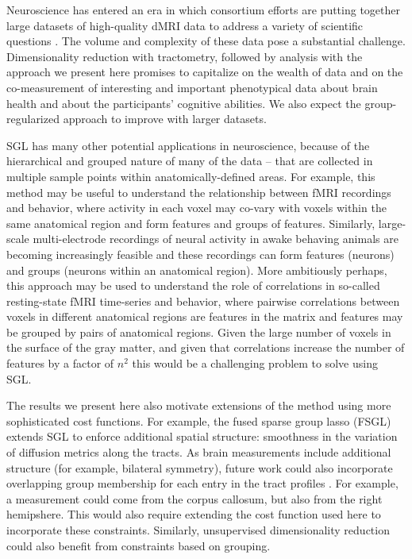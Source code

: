 Neuroscience has entered an era in which consortium efforts are putting together
large datasets of high-quality dMRI data to address a variety of scientific
questions \cite{jernigan2016ping, jernigan2018abcd, alexander2017open,
Miller2016-hw, VanEssen2012}. The volume and complexity of these data pose a
substantial challenge. Dimensionality reduction with tractometry, followed by
analysis with the approach we present here promises to capitalize on the wealth
of data and on the co-measurement of interesting and important phenotypical data
about brain health and about the participants' cognitive abilities. We also
expect the group-regularized approach to improve with larger datasets.

SGL has many other potential applications in neuroscience, because of the
hierarchical and grouped nature of many of the data -- that are collected in
multiple sample points within anatomically-defined areas. For example, this
method may be useful to understand the relationship between fMRI recordings and
behavior, where activity in each voxel may co-vary with voxels within the same
anatomical region and form features and groups of features. Similarly,
large-scale multi-electrode recordings of neural activity in awake behaving
animals are becoming increasingly feasible \cite{steinmetz2018distributed,
Jun2017-gv} and these recordings can form features (neurons) and groups (neurons
within an anatomical region). More ambitiously perhaps, this approach may be
used to understand the role of correlations in so-called resting-state fMRI
time-series and behavior, where pairwise correlations between voxels in
different anatomical regions are features in the matrix and features may be
grouped by pairs of anatomical regions. Given the large number of voxels in the
surface of the gray matter, and given that correlations increase the number of
features by a factor of $n^2$ this would be a challenging problem to solve using
SGL.

The results we present here also motivate extensions of the method using more
sophisticated cost functions. For example, the fused sparse group lasso (FSGL)
\cite{zhou2012} extends SGL to enforce additional spatial structure: smoothness
in the variation of diffusion metrics along the tracts. As brain measurements
include additional structure (for example, bilateral symmetry), future work
could also incorporate overlapping group membership for each entry in the tract
profiles \cite{Rao2014-xm}. For example, a measurement could come from the
corpus callosum, but also from the right hemipshere. This would also require
extending the cost function used here to incorporate these constraints.
Similarly, unsupervised dimensionality reduction \cite{Chamberland2019-mu} could
also benefit from constraints based on grouping.

